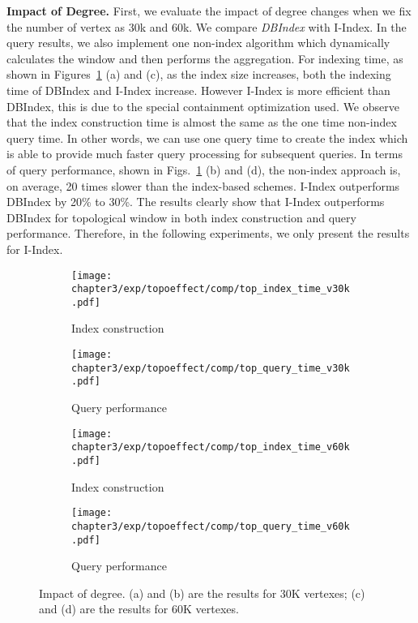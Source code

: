 \textbf{Impact of Degree.} First, we evaluate the impact of degree 
changes when we fix the number of vertex as 30k and 60k.  
We compare \emph{DBIndex} with I-Index. 
In the query results, we also implement one non-index algorithm 
which dynamically calculates the window and then performs the aggregation. 
For indexing time, as shown in Figures~\ref{fig:pi_effect} (a) and (c), as the 
index size increases, both the indexing time of 
DBIndex and I-Index increase. However I-Index is more efficient than 
DBIndex, this is due to the special containment optimization used.  We observe that the 
index construction time is almost the same as the one time non-index query time. In other words, 
we can use one query time to create the index which is able to provide much faster query processing for subsequent queries. 
 In terms of query performance, shown in Figs.~\ref{fig:pi_effect} (b) and 
(d), the non-index approach is, on average, 20 times slower than 
the index-based schemes. I-Index outperforms DBIndex by 20\% to 30\%. 
The results clearly show that I-Index outperforms DBIndex for topological 
window in both index construction and query performance. Therefore, in the following experiments, we only present the results for I-Index. 
 
\begin{figure}
\centering
\begin{subfigure}{0.48\linewidth}
  \centering
  \texttt{[image: chapter3/exp/topoeffect/comp/top\_index\_time\_v30k.pdf]}
  \caption{Index construction}
\end{subfigure}
\begin{subfigure}{0.48\linewidth}
  \centering
  \texttt{[image: chapter3/exp/topoeffect/comp/top\_query\_time\_v30k.pdf]}
  \caption{Query performance}
\end{subfigure}
\begin{subfigure}{0.48\linewidth}
  \centering
  \texttt{[image: chapter3/exp/topoeffect/comp/top\_index\_time\_v60k.pdf]}
  \caption{Index construction}
\end{subfigure}
\begin{subfigure}{0.48\linewidth}
  \centering
  \texttt{[image: chapter3/exp/topoeffect/comp/top\_query\_time\_v60k.pdf]}
  \caption{Query performance}
\end{subfigure}
\caption{Impact of degree. (a) and (b) are the results for 30K vertexes; (c) and (d) are the results for 60K vertexes.}
\label{fig:pi_effect}
\end{figure}


